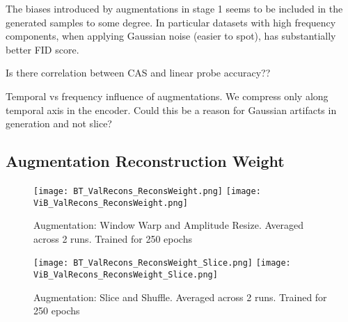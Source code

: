 \documentclass[../../thesis.tex]{subfiles}
\begin{document}
The biases introduced by augmentations in stage 1 seems to be included in the generated samples to some degree. In particular datasets with high frequency components, when applying Gaussian noise (easier to spot), has substantially better FID score.  \newline

Is there correlation between CAS and linear probe accuracy?? \newline

Temporal vs frequency influence of augmentations. We compress only along temporal axis in the encoder. Could this be a reason for Gaussian artifacts in generation and not slice?\newline


\subsection{Augmentation Reconstruction Weight}
\begin{figure}[h]
    \texttt{[image: BT\_ValRecons\_ReconsWeight.png]}
    \texttt{[image: ViB\_ValRecons\_ReconsWeight.png]}
    \caption{Augmentation: Window Warp and Amplitude Resize. Averaged across 2 runs. Trained for 250 epochs}  
    \label{fig:ReconsWeight_warp}
\end{figure}
\begin{figure}[h]
    \texttt{[image: BT\_ValRecons\_ReconsWeight\_Slice.png]}
    \texttt{[image: ViB\_ValRecons\_ReconsWeight\_Slice.png]}
    \caption{Augmentation: Slice and Shuffle. Averaged across 2 runs. Trained for 250 epochs}  
    \label{fig:ReconsWeight_slice}
\end{figure}


\end{document}
